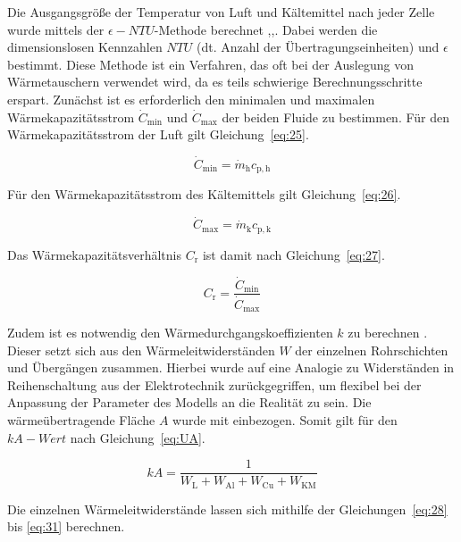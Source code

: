 Die Ausgangsgröße der Temperatur von Luft und Kältemittel nach jeder Zelle wurde mittels der $\epsilon-NTU$-Methode berechnet \cite{SpringerVerlagGmbH.2013},\cite{Bergman.2011},\cite{Nellis.2009}. Dabei werden die dimensionslosen Kennzahlen $NTU$ (dt. Anzahl der Übertragungseinheiten) und $\epsilon$ bestimmt. Diese Methode ist ein Verfahren, das oft bei der Auslegung von Wärmetauschern verwendet wird, da es teils schwierige Berechnungsschritte erspart. Zunächst ist es erforderlich den minimalen und maximalen Wärmekapazitätsstrom $\dot{C}_{\mathrm{min}}$ und $\dot{C}_{\mathrm{max}}$ der beiden Fluide zu bestimmen.
Für den Wärmekapazitätsstrom der Luft gilt Gleichung~\ref{eq:25}.

\begin{equation}
\label{eq:25}
\dot{C}_{\mathrm{min}} = \dot{m}_\mathrm{h} c_{\mathrm{p,h}}
\end{equation} 

Für den Wärmekapazitätsstrom des Kältemittels gilt Gleichung~\ref{eq:26}.

\begin{equation}
\label{eq:26}
\dot{C}_{\mathrm{max}} = \dot{m}_\mathrm{k} c_{\mathrm{p,k}}
\end{equation}
 

Das Wärmekapazitätsverhältnis $C_\mathrm{r}$ ist damit nach Gleichung~\ref{eq:27}.
 
\begin{equation}
\label{eq:27}
C_\mathrm{r} = \frac{\dot{C}_{\mathrm{min}}}{\dot{C}_{\mathrm{max}}}
\end{equation}

Zudem ist es notwendig den Wärmedurchgangskoeffizienten $k$ zu berechnen \cite{LehrstuhlfurWarmeundStoffubertragung.}. Dieser setzt sich aus den Wärmeleitwiderständen $W$ der einzelnen Rohrschichten und Übergängen zusammen.  Hierbei wurde auf eine Analogie zu Widerständen in Reihenschaltung aus der Elektrotechnik zurückgegriffen, um flexibel bei der Anpassung der Parameter des Modells an die Realität zu sein. Die wärmeübertragende Fläche $A$ wurde mit einbezogen. Somit gilt für den $kA-Wert$ nach Gleichung~\ref{eq:UA}.

\begin{equation}
\label{eq:UA}
kA = \frac{1}{W_{\mathrm{L}} + W_{\mathrm{Al}} + W_{\mathrm{Cu}} + W_{\mathrm{KM}}}
\end{equation}
 
Die einzelnen Wärmeleitwiderstände lassen sich mithilfe der Gleichungen~\ref{eq:28} bis \ref{eq:31} berechnen.

